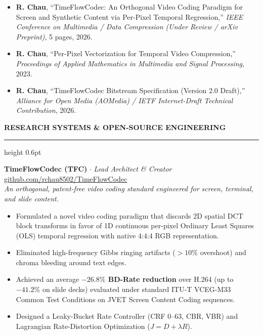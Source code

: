 \documentclass[11pt,letterpaper]{article}
\newcommand{\cvsection}[1]{%
  \vspace{10pt}%
  {\noindent\large\bfseries\MakeUppercase{#1}}\\[-2pt]%
  \hrule height 0.6pt%
  \vspace{5pt}%
}
\begin{document}
\begin{itemize}
    \setlength{\itemsep}{3pt}
    \setlength{\parskip}{0pt}
    \setlength{\parsep}{0pt}
    \item \textbf{R. Chau}, ``TimeFlowCodec: An Orthogonal Video Coding Paradigm for Screen and Synthetic Content via Per-Pixel Temporal Regression,'' \textit{IEEE Conference on Multimedia / Data Compression (Under Review / arXiv Preprint)}, 5 pages, 2026.
    \item \textbf{R. Chau}, ``Per-Pixel Vectorization for Temporal Video Compression,'' \textit{Proceedings of Applied Mathematics in Multimedia and Signal Processing}, 2023.
    \item \textbf{R. Chau}, ``TimeFlowCodec Bitstream Specification (Version 2.0 Draft),'' \textit{Alliance for Open Media (AOMedia) / IETF Internet-Draft Technical Contribution}, 2026.
\end{itemize}

\cvsection{Research Systems \& Open-Source Engineering}

\textbf{TimeFlowCodec (TFC)} $\cdot$ \textit{Lead Architect \& Creator} \hfill \href{https://github.com/rchau8502/TimeFlowCodec}{github.com/rchau8502/TimeFlowCodec} \\
\textit{An orthogonal, patent-free video coding standard engineered for screen, terminal, and slide content.}
\begin{itemize}
    \setlength{\itemsep}{1pt}
    \setlength{\parskip}{0pt}
    \setlength{\parsep}{0pt}
    \item Formulated a novel video coding paradigm that discards 2D spatial DCT block transforms in favor of 1D continuous per-pixel Ordinary Least Squares (OLS) temporal regression with native 4:4:4 RGB representation.
    \item Eliminated high-frequency Gibbs ringing artifacts ($>10\%$ overshoot) and chroma bleeding around text edges.
    \item Achieved an average \textbf{$-26.8\%$ BD-Rate reduction} over H.264 (up to \textbf{$-41.2\%$} on slide decks) evaluated under standard ITU-T VCEG-M33 Common Test Conditions on JVET Screen Content Coding sequences.
    \item Designed a Leaky-Bucket Rate Controller (CRF 0--63, CBR, VBR) and Lagrangian Rate-Distortion Optimization ($J = D + \lambda R$).
\end{itemize}
\end{document}

